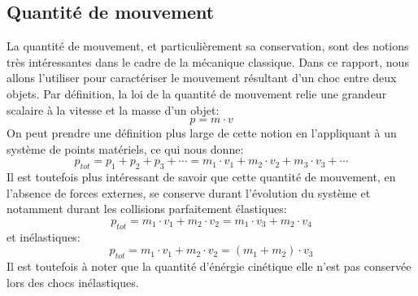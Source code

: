 \subsection{Quantité de mouvement}
La quantité de mouvement, et particulièrement sa conservation, sont des notions très intéressantes dans le cadre de la mécanique classique. Dans ce rapport, nous allons l'utiliser pour caractériser le mouvement résultant d'un choc entre deux objets.
Par définition, la loi de la quantité de mouvement relie une grandeur scalaire à la vitesse et la masse d'un objet:
\begin{equation}
    p = m \cdot v
\end{equation}
On peut prendre une définition plus large de cette notion en l'appliquant à un système de points matériels, ce qui nous donne:
\begin{equation}
    p_{tot} = p_1 + p_2 + p_3 +\cdots = m_1 \cdot v_1 + m_2 \cdot v_2 + m_3 \cdot v_3 +\cdots
\end{equation}
Il est toutefois plus intéressant de savoir que cette quantité de mouvement, en l'absence de forces externes, se conserve durant l'évolution du système et notamment durant les collisions parfaitement élastiques:
\begin{equation}
    \label{ela}
    p_{tot} = m_1 \cdot v_1 + m_2 \cdot v_2 = m_1 \cdot v_3 + m_2 \cdot v_4
\end{equation}
et inélastiques:
\begin{equation}
    \label{inela}
    p_{tot} = m_1 \cdot v_1 + m_2 \cdot v_2 = (m_1 + m_2) \cdot v_3
\end{equation}
Il est toutefois à noter que la quantité d'énérgie cinétique elle n'est pas conservée lors des chocs inélastiques.
